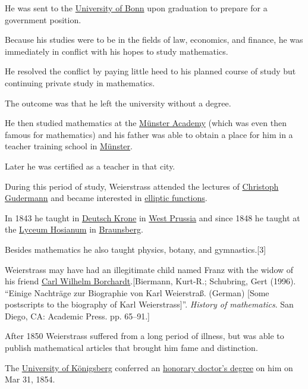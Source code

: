 \documentclass{article}
\begin{document}
He was sent to the \href{https://en.wikipedia.org/wiki/University_of_Bonn}{University of Bonn} upon graduation to prepare for a government position.

Because his studies were to be in the fields of law, economics, and finance, he was immediately in conflict with his hopes to study mathematics.

He resolved the conflict by paying little heed to his planned course of study but continuing private study in mathematics.

The outcome was that he left the university without a degree.

He then studied mathematics at the \href{https://en.wikipedia.org/wiki/University_of_M%C3%BCnster}{Münster Academy} (which was even then famous for mathematics) and his father was able to obtain a place for him in a teacher training school in \href{https://en.wikipedia.org/wiki/M%C3%BCnster}{Münster}.

Later he was certified as a teacher in that city.

During this period of study, Weierstrass attended the lectures of \href{https://en.wikipedia.org/wiki/Christoph_Gudermann}{Christoph Gudermann} and became interested in \href{https://en.wikipedia.org/wiki/Elliptic_function}{elliptic functions}.

%
In 1843 he taught in \href{https://en.wikipedia.org/wiki/Wa%C5%82cz}{Deutsch Krone} in \href{https://en.wikipedia.org/wiki/West_Prussia}{West Prussia} and since 1848 he taught at the \href{https://en.wikipedia.org/wiki/Collegium_Hosianum}{Lyceum Hosianum} in \href{https://en.wikipedia.org/wiki/Braunsberg}{Braunsberg}.

Besides mathematics he also taught physics, botany, and gymnastics.[3]

%
Weierstrass may have had an illegitimate child named Franz with the widow of his friend \href{https://en.wikipedia.org/wiki/Carl_Wilhelm_Borchardt}{Carl Wilhelm Borchardt}.[Biermann, Kurt-R.; Schubring, Gert (1996). ``Einige Nachträge zur Biographie von Karl Weierstraß. (German) [Some postscripts to the biography of Karl Weierstrass]''. \textit{History of mathematics}. San Diego, CA: Academic Press. pp. 65--91.]

%
After 1850 Weierstrass suffered from a long period of illness, but was able to publish mathematical articles that brought him fame and distinction.

The \href{https://en.wikipedia.org/wiki/University_of_K%C3%B6nigsberg}{University of Königsberg} conferred an \href{https://en.wikipedia.org/wiki/Honorary_doctor%27s_degree}{honorary doctor's degree} on him on Mar 31, 1854.
\end{document}
